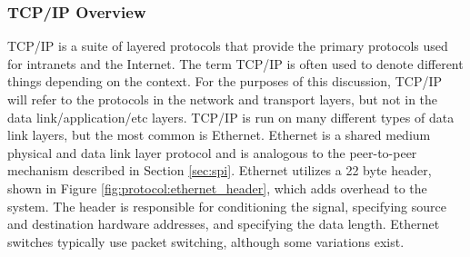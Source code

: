 \subsubsection{TCP/IP Overview}\label{sec:protocol:background:protocols:tcpip}

TCP/IP is a suite of layered protocols that provide the primary protocols used for intranets and the Internet. The term TCP/IP is often used to denote different things depending on the context. For the purposes of this discussion, TCP/IP will refer to the protocols in the network and transport layers, but not in the data link/application/etc layers. TCP/IP is run on many different types of data link layers, but the most common is Ethernet. Ethernet is a shared medium physical and data link layer protocol and is analogous to the peer-to-peer mechanism described in Section \ref{sec:spi}.  Ethernet utilizes a 22 byte header, shown in Figure \ref{fig:protocol:ethernet_header}, which adds overhead to the system. The header is responsible for conditioning the signal, specifying source and destination hardware addresses, and specifying the data length. Ethernet switches typically use packet switching, although some variations exist. \cite{ref:2004-forouzan-data_communications_and_networking}

